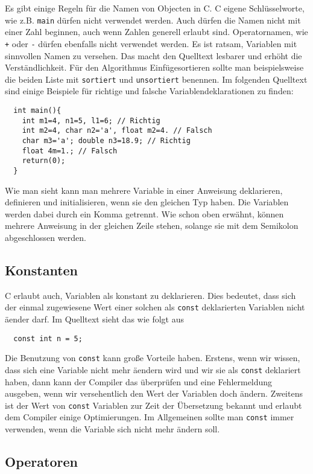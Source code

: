 Es gibt einige Regeln für die Namen von Objecten in C. 
C eigene Schlüsselworte, wie z.B. \texttt{main} dürfen nicht verwendet werden.
Auch dürfen die Namen nicht mit einer Zahl beginnen, auch wenn Zahlen generell erlaubt sind.
Operatornamen, wie \verb|+| oder \verb|-| dürfen ebenfalls nicht verwendet werden.
Es ist ratsam, Variablen mit sinnvollen Namen zu versehen.
Das macht den Quelltext lesbarer und erhöht die Verständlichkeit.
Für den Algorithmus Einfügesortieren sollte man beispielsweise die beiden Liste mit \texttt{sortiert} und \texttt{unsortiert} benennen.
Im folgenden Quelltext sind einige Beispiele für richtige und falsche Variablendeklarationen zu finden:
\begin{lstlisting}
  int main(){
    int m1=4, n1=5, l1=6; // Richtig
    int m2=4, char n2='a', float m2=4. // Falsch
    char m3='a'; double n3=18.9; // Richtig
    float 4m=1.; // Falsch
    return(0);
  }
\end{lstlisting} 
Wie man sieht kann man mehrere Variable in einer Anweisung deklarieren, definieren und initialisieren, wenn sie den gleichen Typ haben.
Die Variablen werden dabei durch ein Komma getrennt.
Wie schon oben erwähnt, können mehrere Anweisung in der gleichen Zeile stehen, solange sie mit dem Semikolon abgeschlossen werden.

\subsection{Konstanten}

C erlaubt auch, Variablen als konstant zu deklarieren. 
Dies bedeutet, dass sich der einmal zugewiesene Wert einer solchen als \verb|const| deklarierten Variablen nicht äender darf.
Im Quelltext sieht das wie folgt aus
\begin{lstlisting}
  const int n = 5;
\end{lstlisting}
Die Benutzung von \verb|const| kann große Vorteile haben.
Erstens, wenn wir wissen, dass sich eine Variable nicht mehr äendern wird und wir sie als  \verb|const| deklariert haben, dann kann der Compiler das überprüfen und eine Fehlermeldung ausgeben, wenn wir versehentlich den Wert der Variablen doch ändern.
Zweitens ist der Wert von \verb|const| Variablen zur Zeit der Übersetzung bekannt und erlaubt dem Compiler einige Optimierungen.
Im Allgemeinen sollte man \verb|const| immer verwenden, wenn die Variable sich nicht mehr ändern soll.

\subsection{Operatoren}

